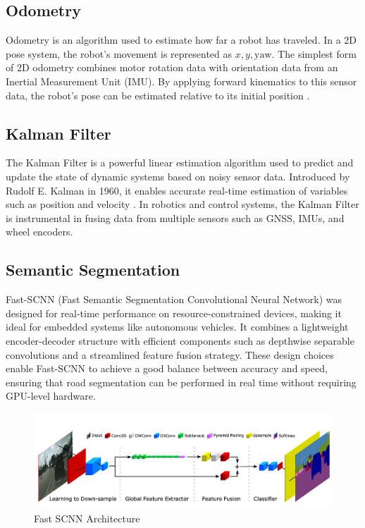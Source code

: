 \documentclass[conference]{IEEEtran}
\begin{document}
\subsection{Odometry}
Odometry is an algorithm used to estimate how far a robot has traveled. In a 2D pose system, the robot’s movement is represented as \(x, y, \text{yaw}\). The simplest form of 2D odometry combines motor rotation data with orientation data from an Inertial Measurement Unit (IMU). By applying forward kinematics to this sensor data, the robot's pose can be estimated relative to its initial position \cite{ref_mas_marin}.

\subsection{Kalman Filter}
The Kalman Filter is a powerful linear estimation algorithm used to predict and update the state of dynamic systems based on noisy sensor data. Introduced by Rudolf E. Kalman in 1960, it enables accurate real-time estimation of variables such as position and velocity \cite{kalman1960new}. In robotics and control systems, the Kalman Filter is instrumental in fusing data from multiple sensors such as GNSS, IMUs, and wheel encoders.

\subsection{Semantic Segmentation}

Fast-SCNN (Fast Semantic Segmentation Convolutional Neural Network) was designed for real-time performance on resource-constrained devices, making it ideal for embedded systems like autonomous vehicles. It combines a lightweight encoder-decoder structure with efficient components such as depthwise separable convolutions and a streamlined feature fusion strategy. These design choices enable Fast-SCNN to achieve a good balance between accuracy and speed, ensuring that road segmentation can be performed in real time without requiring GPU-level hardware.

\begin{figure}[H]
	\centering
	\includegraphics[width=\linewidth]{../konten/fast_scnn.png}
	\caption{Fast SCNN Architecture \cite{ref_fast_scnn}}
	\label{fig:fast_scnn_architecture}
\end{figure} 
\end{document}

